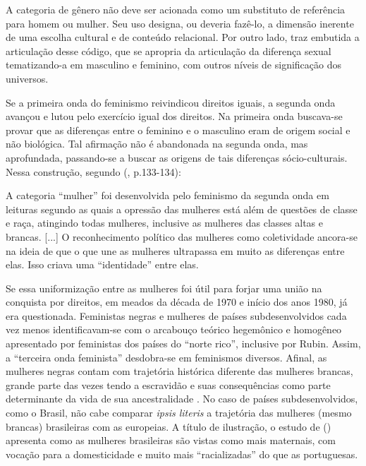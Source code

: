 \begin{citacao}
A categoria de gênero não deve ser acionada como um substituto de referência para homem ou mulher. Seu uso designa, ou deveria fazê-lo, a dimensão inerente de uma escolha cultural e de conteúdo relacional. Por outro lado, traz embutida a articulação desse código, que se apropria da articulação da diferença sexual tematizando-a em masculino e feminino, com outros níveis de significação dos universos.
\end{citacao}

Se a primeira onda do feminismo reivindicou direitos iguais, a segunda onda avançou e lutou pelo exercício igual dos direitos. Na primeira onda buscava-se provar que as diferenças entre o feminino e o masculino eram de origem social e não biológica. Tal afirmação não é abandonada na segunda onda, mas aprofundada, passando-se a buscar as origens de tais diferenças sócio-culturais. Nessa construção, segundo  (\citeyear{PISCITELLI2009}, p.133-134):

\begin{citacao}
A categoria ``mulher'' foi desenvolvida pelo feminismo da segunda onda em leituras segundo as quais a opressão das mulheres está além de questões de classe e raça, atingindo todas mulheres, inclusive as mulheres das classes altas e brancas. [...] O reconhecimento político das mulheres como coletividade ancora-se na ideia de que o que une as mulheres ultrapassa em muito as diferenças entre elas. Isso criava uma ``identidade'' entre elas.
\end{citacao}

Se essa uniformização entre as mulheres foi útil para forjar uma união na conquista por direitos, em meados da década de 1970 e início dos anos 1980, já era questionada. Feministas negras e mulheres de países subdesenvolvidos \cite{FURTADO2009} cada vez menos identificavam-se com o arcabouço teórico hegemônico e homogêneo apresentado por feministas dos países do ``norte rico'', inclusive por Rubin. Assim, a ``terceira onda feminista'' desdobra-se em feminismos diversos. Afinal, as mulheres negras contam com trajetória histórica diferente das mulheres brancas, grande parte das vezes tendo a escravidão e suas consequências como parte determinante da vida de sua ancestralidade \cite{HOOKS1990,CRENSHAW2002}. No caso de países subdesenvolvidos, como o Brasil, não cabe comparar \emph{ipsis literis} a trajetória das mulheres (mesmo brancas) brasileiras com as europeias. A título de ilustração, o estudo de  (\citeyear{PINTO2004}) apresenta como as mulheres brasileiras são vistas como mais maternais, com vocação para a domesticidade e muito mais ``racializadas'' do que as portuguesas.

